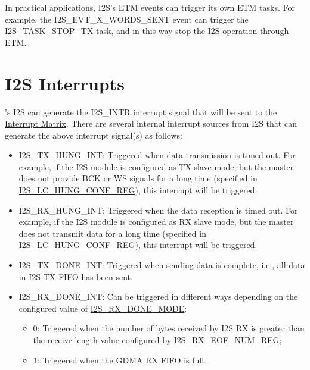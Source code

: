\documentclass[main\_\_EN.tex]{subfiles}
\begin{document}
In practical applications, I2S's ETM events can trigger its own ETM tasks. For example, the I2S\_EVT\_X\_WORDS\_SENT event can trigger the I2S\_TASK\_STOP\_TX task, and in this way stop the I2S operation through ETM.



\section{I2S Interrupts} \label{sec:i2s-interrupts}

\chipname{}'s I2S can generate the I2S\_INTR interrupt signal that will be sent to the \hyperref[mod:intmtrx]{Interrupt Matrix}. There are several internal interrupt sources from I2S  that can generate the above interrupt signal(s) as follows:

\begin{itemize}
\item \label{int:I2STXHUNGINT}I2S\_TX\_HUNG\_INT: Triggered when data transmission is timed out. For example, if the I2S module is configured as TX slave mode, but the master does not provide BCK or WS signals for a long time (specified in \hyperref[regdesc:I2SLCHUNGCONFREG]{I2S\_LC\_HUNG\_CONF\_REG}), this interrupt will be triggered.
\item \label{int:I2SRXHUNGINT}I2S\_RX\_HUNG\_INT: Triggered when the data reception is timed out. For example, if the I2S module is configured as RX slave mode, but the master does not transmit data for a long time (specified in \hyperref[regdesc:I2SLCHUNGCONFREG]{I2S\_LC\_HUNG\_CONF\_REG}), this interrupt will be triggered.
\item \label{int:I2STXDONEINT}I2S\_TX\_DONE\_INT: Triggered when sending data is complete, i.e., all data in I2S TX FIFO has been sent.
\item \label{int:I2SRXDONEINT}I2S\_RX\_DONE\_INT: Can be triggered in different ways depending on the configured value of \hyperref[fielddesc:I2SRXDONEMODE]{I2S\_RX\_DONE\_MODE}:
\begin{itemize}
    \item 0: Triggered when the number of bytes received by I2S RX is greater than the receive length value configured by \hyperref[regdesc:I2SRXEOFNUMREG]{I2S\_RX\_EOF\_NUM\_REG};
    \item 1: Triggered when the GDMA RX FIFO is full.
\end{itemize}
\end{itemize}
\end{document}
